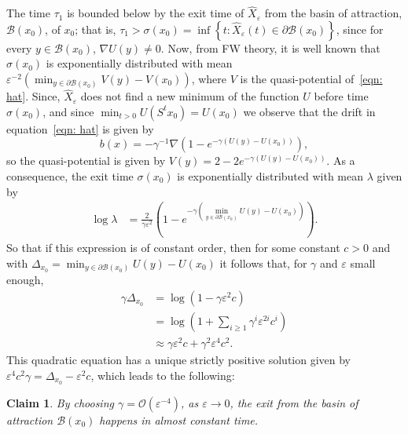 \documentclass{amsproc}
\newtheorem{claim}[theorem]{Claim}
\newcommand{\eps}{\varepsilon}
\newcommand{\hatx}{\hat X_\eps}
\begin{document}
The time $\tau_1$ is bounded below by the exit time of $\hatx$ from the basin of attraction, $\mathcal{B}(x_0)$, of $x_0$; that is,  
$\tau_1 > \sigma(x_0) = \inf \left \{ t: \hatx(t) \in \partial \mathcal{B}(x_0) \right \}$, since for every $y \in \mathcal{B}(x_0)$, $\nabla U(y)\not = 0$.  Now, from FW theory, it is well known that $\sigma(x_0)$ is exponentially distributed with mean $\eps^{-2} \left( \min_{ y \in \partial \mathcal{B}(x_0) } V(y) - V(x_0) \right )$, where $V$ is the quasi-potential of~\eqref{eqn: hat}. Since, $\hatx$ does not find a new minimum of the function $U$ before time $\sigma(x_0)$, and since $\min_{t>0} U(S^t x_0) = U(x_0)$ we observe that the drift in equation~\eqref{eqn: hat} is given by 
\[
b(x) = - \gamma^{-1} \nabla \left( 1 -  e^{ -\gamma \left (  U(y) - U(x_0)  \right ) } \right),
\]
so the quasi-potential is given by $V(y) = 2 - 2e^{ -\gamma \left (  U(y) - U(x_0)  \right ) }.$
As a consequence, the exit time $\sigma(x_0)$ is exponentially distributed with mean $\lambda$ given by
\begin{align*}
\log \lambda &= \frac{2}{\gamma \eps^2} \left( 1 -  e^{ -\gamma \left (  \min_{ y \in \partial \mathcal{B}(x_0) } U(y) - U(x_0)  \right ) }  \right).
\end{align*}
So that if this expression is of constant order, then for some constant $c>0$ and with $\Delta_{ x_0 } = \min_{ y \in \partial \mathcal{B}(x_0) } U(y) - U(x_0)$ it follows that, for $\gamma$ and $\eps$ small enough,
\begin{align*}
\gamma \Delta_{x_0} &= \log \left( 1 - \gamma \eps^2 c \right) \\
&=  \log\left(  1 + \sum_{i\geq 1} \gamma^i \eps^{2i} c^i \right)\\
&\approx \gamma \eps^2 c + \gamma^2 \eps^4 c^2.
\end{align*}
This quadratic equation has a unique strictly positive solution given by $\eps^4 c^2 \gamma = \Delta_{x_0} - \eps^2 c$, which leads to the following:

\begin{claim}
By choosing $\gamma = \mathcal{O}( \eps^{-4} )$, as $\eps \to 0$, the exit from the basin of attraction $\mathcal{B}(x_0)$ happens in almost constant time.
\end{claim}
\end{document}
